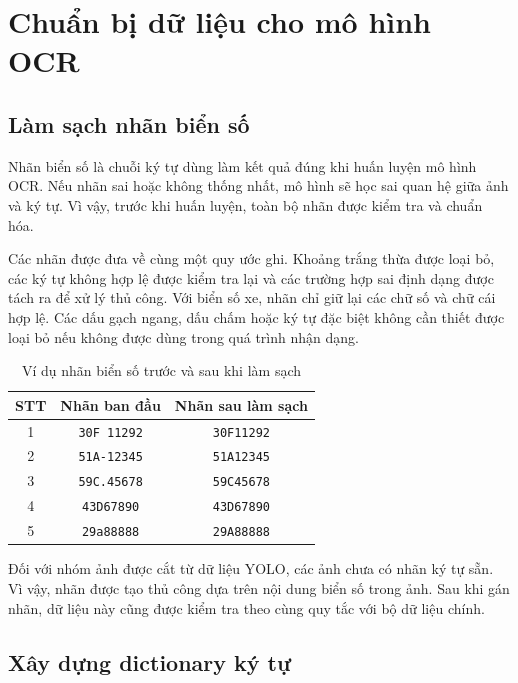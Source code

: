 \documentclass[13pt,a4paper]{report}
\begin{document}
\section{Chuẩn bị dữ liệu cho mô hình OCR}

\subsection{Làm sạch nhãn biển số}

Nhãn biển số là chuỗi ký tự dùng làm kết quả đúng khi huấn luyện mô hình OCR. Nếu nhãn sai hoặc không thống nhất, mô hình sẽ học sai quan hệ giữa ảnh và ký tự. Vì vậy, trước khi huấn luyện, toàn bộ nhãn được kiểm tra và chuẩn hóa.

Các nhãn được đưa về cùng một quy ước ghi. Khoảng trắng thừa được loại bỏ, các ký tự không hợp lệ được kiểm tra lại và các trường hợp sai định dạng được tách ra để xử lý thủ công. Với biển số xe, nhãn chỉ giữ lại các chữ số và chữ cái hợp lệ. Các dấu gạch ngang, dấu chấm hoặc ký tự đặc biệt không cần thiết được loại bỏ nếu không được dùng trong quá trình nhận dạng.

\begin{table}[H]
	\centering
	\caption{Ví dụ nhãn biển số trước và sau khi làm sạch}
	\label{tab:vi_du_lam_sach_nhan_ocr}
	\begin{tabular}{|c|c|c|}
		\hline
		\textbf{STT} & \textbf{Nhãn ban đầu} & \textbf{Nhãn sau làm sạch} \\
		\hline
		1 & \texttt{30F 11292} & \texttt{30F11292} \\
		\hline
		2 & \texttt{51A-12345} & \texttt{51A12345} \\
		\hline
		3 & \texttt{59C.45678} & \texttt{59C45678} \\
		\hline
		4 & \texttt{ 43D67890 } & \texttt{43D67890} \\
		\hline
		5 & \texttt{29a88888} & \texttt{29A88888} \\
		\hline
	\end{tabular}
\end{table}

Đối với nhóm ảnh được cắt từ dữ liệu YOLO, các ảnh chưa có nhãn ký tự sẵn. Vì vậy, nhãn được tạo thủ công dựa trên nội dung biển số trong ảnh. Sau khi gán nhãn, dữ liệu này cũng được kiểm tra theo cùng quy tắc với bộ dữ liệu chính.

\subsection{Xây dựng dictionary ký tự}
\end{document}
